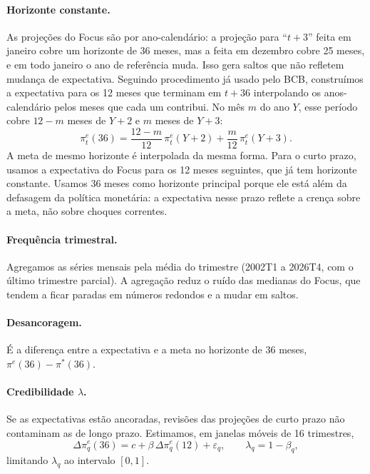 \documentclass[11pt,a4paper]{article}
\newcommand{\pe}{\pi^{e}}
\newcommand{\meta}{\pi^{*}}
\begin{document}
\paragraph{Horizonte constante.} As projeções do Focus são por ano-calendário: a projeção para ``$t+3$'' feita em janeiro cobre um horizonte de 36 meses, mas a feita em dezembro cobre 25 meses, e em todo janeiro o ano de referência muda. Isso gera saltos que não refletem mudança de expectativa. Seguindo procedimento já usado pelo BCB, construímos a expectativa para os 12 meses que terminam em $t+36$ interpolando os anos-calendário pelos meses que cada um contribui. No mês $m$ do ano $Y$, esse período cobre $12-m$ meses de $Y+2$ e $m$ meses de $Y+3$:
\begin{equation}
\pe_t(36) = \frac{12-m}{12}\,\pe_t(Y+2) + \frac{m}{12}\,\pe_t(Y+3) .
\end{equation}
A meta de mesmo horizonte é interpolada da mesma forma. Para o curto prazo, usamos a expectativa do Focus para os 12 meses seguintes, que já tem horizonte constante. Usamos 36 meses como horizonte principal porque ele está além da defasagem da política monetária: a expectativa nesse prazo reflete a crença sobre a meta, não sobre choques correntes.

\paragraph{Frequência trimestral.} Agregamos as séries mensais pela média do trimestre (2002T1 a 2026T4, com o último trimestre parcial). A agregação reduz o ruído das medianas do Focus, que tendem a ficar paradas em números redondos e a mudar em saltos.

\paragraph{Desancoragem.} É a diferença entre a expectativa e a meta no horizonte de 36 meses, $\pe(36)-\meta(36)$.

\paragraph{Credibilidade $\lambda$.} Se as expectativas estão ancoradas, revisões das projeções de curto prazo não contaminam as de longo prazo. Estimamos, em janelas móveis de 16 trimestres,
\begin{equation}
\Delta\pe_{q}(36) = c + \beta\,\Delta\pe_{q}(12) + \varepsilon_q, \qquad \lambda_q = 1-\beta_q ,
\end{equation}
limitando $\lambda_q$ ao intervalo $[0,1]$.
\end{document}
